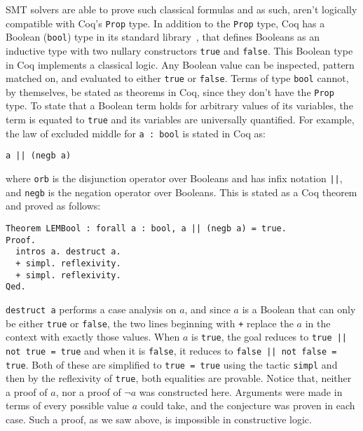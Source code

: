 \documentclass[11pt]{article}
\begin{document}
	SMT solvers are able to prove 
	such classical formulas and as
	such, aren't logically compatible
	with Coq's \texttt{Prop} type. 
	In addition to the \texttt{Prop} 
	type, Coq has a Boolean 
	(\texttt{bool}) type in its standard 
	library~\cite{CoqBool}, that defines 
	Booleans as an 
	inductive type with two nullary
	constructors \texttt{true} and
	\texttt{false}. This Boolean type 
	in Coq implements a classical 
	logic. Any Boolean value can 
	be inspected, pattern matched on,
	and evaluated to either 
	\texttt{true} or \texttt{false}.
	Terms of type \texttt{bool} 
	cannot, by themselves, be 
	stated as theorems
	in Coq, since they don't have 
	the \texttt{Prop} type. To 
	state that a Boolean term holds
	for arbitrary values of its variables,
	the term is 
	equated to \texttt{true}
	and its variables are 
	universally quantified. 
	For example, the law of 
	excluded middle for 
	\texttt{a : bool} is stated in 
	Coq as: 
	\begin{center}
		\texttt{a || (negb a)}
	\end{center}
	where \texttt{orb} is the 
	disjunction operator over 
	Booleans and has 
	infix notation \texttt{||},
	and \texttt{negb} is the 
	negation operator over 
	Booleans.
	This is stated as a Coq theorem 
	and proved as follows:
	\begin{verbatim}
Theorem LEMBool : forall a : bool, a || (negb a) = true.
Proof.
  intros a. destruct a.
  + simpl. reflexivity.
  + simpl. reflexivity.
Qed.
	\end{verbatim}
	\texttt{destruct a} performs a 
	case analysis on $a$, and since $a$ 
	is a Boolean that can 
	only be either \texttt{true}
	or \texttt{false}, the two lines
	beginning with \texttt{+} 
	replace the $a$ in the context
	with exactly those values.
	When $a$ is \texttt{true}, the 
	goal reduces to 
	\texttt{true || not true = true}
	and when it is \texttt{false}, it
	reduces to 
	\texttt{false || not false = true}.
	Both of these are simplified to 
	\texttt{true = true} using the 
	tactic \texttt{simpl} and then 
	by the reflexivity of 
	\texttt{true}, both equalities
	are provable. Notice that, 
	neither a proof of $a$, nor 
	a proof of $\neg a$ was 
	constructed here. Arguments were
	made in terms of every possible 
	value $a$ could take, and the
	conjecture was proven in 
	each case. Such a proof, as we 
	saw above, is impossible in 
	constructive logic.
	
\end{document}

